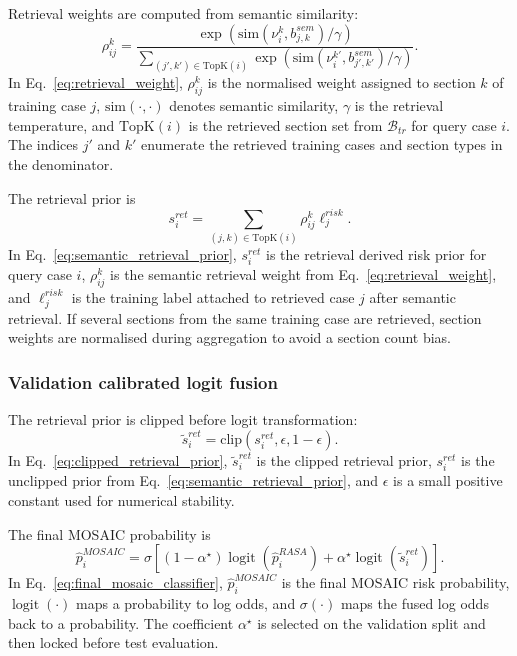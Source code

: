 Retrieval weights are computed from semantic similarity:
\begin{equation}
\rho_{ij}^{k}
=
\frac{\exp(\mathrm{sim}(\nu_i^k,b_{j,k}^{sem})/\gamma)}
{\sum_{(j',k')\in\mathrm{TopK}(i)}\exp(\mathrm{sim}(\nu_i^{k'},b_{j',k'}^{sem})/\gamma)}.
\label{eq:retrieval_weight}
\end{equation}
In Eq.~\eqref{eq:retrieval_weight}, $\rho_{ij}^{k}$ is the normalised weight assigned to section $k$ of training case $j$, $\mathrm{sim}(\cdot,\cdot)$ denotes semantic similarity, $\gamma$ is the retrieval temperature, and $\mathrm{TopK}(i)$ is the retrieved section set from $\mathcal{B}_{tr}$ for query case $i$. The indices $j'$ and $k'$ enumerate the retrieved training cases and section types in the denominator.

The retrieval prior is
\begin{equation}
s_i^{ret}
=
\sum_{(j,k)\in\mathrm{TopK}(i)}
\rho_{ij}^{k}\ell_j^{risk}.
\label{eq:semantic_retrieval_prior}
\end{equation}
In Eq.~\eqref{eq:semantic_retrieval_prior}, $s_i^{ret}$ is the retrieval derived risk prior for query case $i$, $\rho_{ij}^{k}$ is the semantic retrieval weight from Eq.~\eqref{eq:retrieval_weight}, and $\ell_j^{risk}$ is the training label attached to retrieved case $j$ after semantic retrieval. If several sections from the same training case are retrieved, section weights are normalised during aggregation to avoid a section count bias.

\subsubsection{Validation calibrated logit fusion}
\label{subsubsec:validation_calibrated_logit_fusion}

The retrieval prior is clipped before logit transformation:
\begin{equation}
\tilde{s}_i^{ret}=\mathrm{clip}(s_i^{ret},\epsilon,1-\epsilon).
\label{eq:clipped_retrieval_prior}
\end{equation}
In Eq.~\eqref{eq:clipped_retrieval_prior}, $\tilde{s}_i^{ret}$ is the clipped retrieval prior, $s_i^{ret}$ is the unclipped prior from Eq.~\eqref{eq:semantic_retrieval_prior}, and $\epsilon$ is a small positive constant used for numerical stability.

The final MOSAIC probability is
\begin{equation}
\hat{p}_i^{MOSAIC}
=
\sigma\left[(1-\alpha^{\star})\operatorname{logit}(\hat{p}_i^{RASA})
+\alpha^{\star}\operatorname{logit}(\tilde{s}_i^{ret})\right].
\label{eq:final_mosaic_classifier}
\end{equation}
In Eq.~\eqref{eq:final_mosaic_classifier}, $\hat{p}_i^{MOSAIC}$ is the final MOSAIC risk probability, $\operatorname{logit}(\cdot)$ maps a probability to log odds, and $\sigma(\cdot)$ maps the fused log odds back to a probability. The coefficient $\alpha^{\star}$ is selected on the validation split and then locked before test evaluation.

